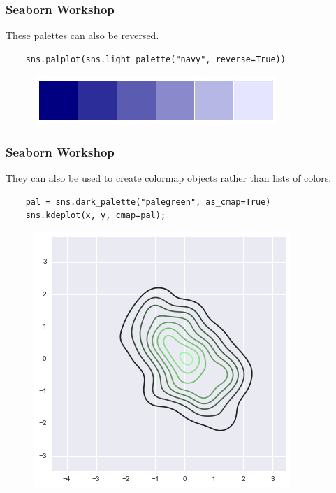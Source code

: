 \documentclass{beamer}
\begin{document}
\begin{frame}[fragile]
	\frametitle{Seaborn Workshop}
	\large
	These palettes can also be reversed.
	\begin{verbatim}
	sns.palplot(sns.light_palette("navy", reverse=True))
	\end{verbatim}
	\begin{figure}
		\centering
		\includegraphics[width=0.7\linewidth]{images/color_palettes_46_0}
		\caption{}
		\label{fig:color_palettes_46_0}
	\end{figure}
	
	
\end{frame}
\begin{frame}[fragile]
	\frametitle{Seaborn Workshop}
	\large
	
	They can also be used to create colormap objects rather than lists of colors.
	\begin{verbatim}
	pal = sns.dark_palette("palegreen", as_cmap=True)
	sns.kdeplot(x, y, cmap=pal);
	\end{verbatim}
	
	\begin{figure}
		\centering
		\includegraphics[width=0.7\linewidth]{images/color_palettes_48_0}
		\caption{}
		\label{fig:color_palettes_48_0}
	\end{figure}
\end{frame}
\end{document}
